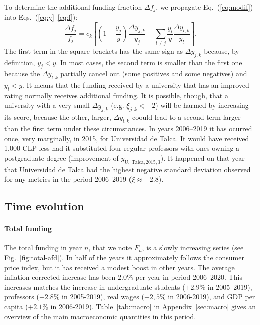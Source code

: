\documentclass[twocolumn]{article}
\def\eqref#1{Eq.~(\ref{eq:#1})}
\def\eqsref#1#2{Eqs.~(\ref{eq:#1}--\ref{eq:#2})}
\begin{document}
To determine the additional funding fraction $\Delta f_j$, we propagate 
\eqref{modif} into \eqsref{y}{f}:
\begin{equation}
    \frac{\Delta f_j}{f_j} = c_k \left[
                     \left(1 - \frac{y_{j}}y\right)\frac{\Delta y_{j,k}}{y_{j}}
                    - \sum_{l \ne j} \frac{y_l}y \frac{\Delta y_{l,k}}{y_l}
                 \right].
\end{equation}
The first term in the square brackets has the same sign as $\Delta y_{j,k}$ because, by definition, $y_j < y$.  In most cases, the second term is smaller than the first one because the $\Delta y_{l,k}$ partially cancel out (some positives and some negatives) and $y_l < y$. It means that the funding received by a university that has an improved rating normally receives additional funding.  It is possible, though, that a university with a very small $\Delta y_{j,k}$ (e.g. $\xi_{j,k} < -2$) will be harmed by increasing its score, because the other, larger, $\Delta y_{l,k}$ coould lead to a second term larger than the first term under these circumstances.  In years 2006--2019 it has ocurred once, very marginally, in 2015, for Universidad de Talca.  It would have received 1,000 CLP less had it substituted four regular professors with ones owning a postgraduate degree (improvement of $y_{\text{U. Talca}, 2015, 3}$).  It happened on that year that Universidad de Talca had the highest negative standard deviation observed for any metrics in the period 2006--2019 ($\xi \approx -2.8$). 

\subsection{Time evolution}
\paragraph{Total funding}
The total funding in year $n$, that we note $F_{n}$, is a slowly increasing series (see Fig.~\ref{fig:total-afd}). In half of the years it approximately follows the consumer price index, but it has received a modest boost in other years.  The average inflation-corrected increase has been $2.0$\% per year in period 2006--2020. This increases matches the increase in undergraduate students ($+2.9\%$ in 2005--2019), professors ($+2.8\%$ in 2005-2019), real wages ($+2,5\%$ in 2006-2019), and GDP per capita ($+2.1$\% in 2006-2019). Table~\ref{tab:macro} in Appendix~\ref{sec:macro} gives an overview of the main macroeconomic quantities in this period. 
\end{document}
